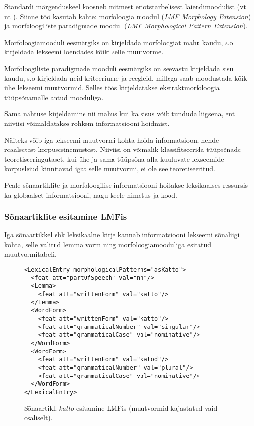 \documentclass[12pt,a4paper]{article}
\begin{document}
Standardi märgenduskeel koosneb mitmest eriotstarbelisest laiendimoodulist (vt nt \cite{francopoulo_lmf_2013}). Siinne töö kasutab kahte: morfoloogia moodul (\textit{LMF Morphology Extension}) ja morfoloogiliste paradigmade moodul (\textit{LMF Morphological Pattern Extension}).

Morfoloogiamooduli eesmärgiks on kirjeldada morfoloogiat mahu kaudu, s.o kirjeldada lekseemi loendades kõiki selle muutvorme.

Morfoloogiliste paradigmade mooduli eesmärgiks on seevastu kirjeldada sisu kaudu, s.o kirjeldada neid kriteeriume ja reegleid, millega saab moodustada kõik ühe lekseemi muutvormid. Selles töös kirjeldatakse ekstraktmorfoloogia tüüpsõnamalle antud mooduliga.

Sama nähtuse kirjeldamine nii mahus kui ka sisus võib tunduda liigsena, ent niiviisi võimaldatakse rohkem informatsiooni hoidmist.

Näiteks võib iga lekseemi muutvormi kohta hoida informatsiooni nende reaalsetest korpusesinemustest. Niiviisi on võimalik klassifitseerida tüüpsõnade teoretiseeringutaset, kui ühe ja sama tüüpsõna alla kuuluvate lekseemide korpusleiud kinnitavad igat selle muutvormi, ei ole see teoretiseeritud.


Peale sõnaartiklite ja morfoloogilise informatsiooni hoitakse leksikaalses ressursis ka globaalset informatsiooni, nagu keele nimetus ja kood.




\subsubsection{Sõnaartiklite esitamine LMFis}
Iga sõnaartikkel ehk leksikaalne kirje kannab informatsiooni lekseemi sõnaliigi kohta, selle valitud lemma vorm ning morfoloogiamooduliga esitatud muutvormitabeli.

\begin{figure} %
  \center
\begin{verbatim}
<LexicalEntry morphologicalPatterns="asKatto">
  <feat att="partOfSpeech" val="nn"/>
  <Lemma>
    <feat att="writtenForm" val="katto"/>
  </Lemma>
  <WordForm>
    <feat att="writtenForm" val="katto"/>
    <feat att="grammaticalNumber" val="singular"/>
    <feat att="grammaticalCase" val="nominative"/>
  </WordForm>
  <WordForm>
    <feat att="writtenForm" val="katod"/>
    <feat att="grammaticalNumber" val="plural"/>
    <feat att="grammaticalCase" val="nominative"/>
  </WordForm>
</LexicalEntry>
\end{verbatim}
\caption{Sõnaartikli \textit{katto} esitamine LMFis (muutvormid kajastatud vaid osaliselt).
  \label{code:lmf-lexicalentry}}
\end{figure}
\end{document}
